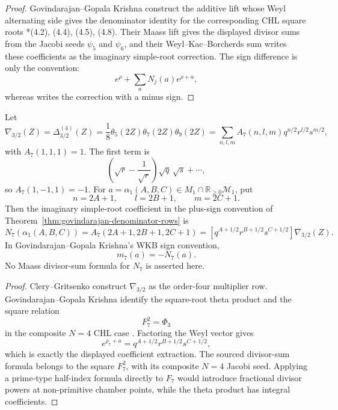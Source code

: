 \documentclass[11pt]{memoir}
\newcommand{\R}{\mathbb{R}} \newcommand{\La}{\Lambda}
\begin{document}
\begin{proof}
Govindarajan--Gopala Krishna construct the additive lift whose Weyl
alternating side gives the denominator identity for the corresponding
CHL square roots \cite{GK09CHL}*{(4.2), (4.4), (4.5), (4.8)}.  Their
Maass lift gives the displayed divisor sums from the Jacobi seeds
$\psi_5$ and $\psi_6$, and their Weyl--Kac--Borcherds sum writes these
coefficients as the imaginary simple-root correction.  The sign
difference is only the convention:
$$
e^\rho+\sum_aN_j(a)e^{\rho+a},
$$
whereas \cite{GK09CHL} writes the correction with a minus sign.
\end{proof}

\begin{lemma}
\label{lem:nabla-three-halves-coefficients}
Let
$$
\nabla_{3/2}(Z)=\Delta^{(4)}_{3/2}(Z)
=\frac18\theta_5(2Z)\theta_7(2Z)\theta_9(2Z)
=\sum_{n,l,m}A_7(n,l,m)q^{n/2}r^{l/2}s^{m/2},
$$
with $A_7(1,1,1)=1$.  The first term is
$$
\left(\sqrt r-\frac1{\sqrt r}\right)\sqrt q\,\sqrt s+\cdots,
$$
so $A_7(1,-1,1)=-1$.  For
$a=\alpha_1(A,B,C)\in M_1\cap\R_{\ge0}\mathcal M_1$, put
$$
n=2A+1,\qquad l=2B+1,\qquad m=2C+1.
$$
Then the imaginary simple-root coefficient in the plus-sign convention
of Theorem~\ref{thm:govindarajan-denominator-rows} is
$$
N_7(\alpha_1(A,B,C))=A_7(2A+1,2B+1,2C+1)
=[q^{A+1/2}r^{B+1/2}s^{C+1/2}]\nabla_{3/2}(Z).
$$
In Govindarajan--Gopala Krishna's WKB sign convention,
$$m_7(a)=-N_7(a).$$
No Maass divisor-sum formula for $N_7$ is asserted here.
\end{lemma}

\begin{proof}
Clery--Gritsenko construct $\nabla_{3/2}$ as the order-four
multiplier row.  Govindarajan--Gopala Krishna identify the square-root
theta product and the square relation
$$
F_7^2=\Phi_3
$$
in the composite $N=4$ CHL case \cite{GK10Composite}.  Factoring the
Weyl vector gives
$$
e^{\rho_7+a}=q^{A+1/2}r^{B+1/2}s^{C+1/2},
$$
which is exactly the displayed coefficient extraction.  The sourced
divisor-sum formula belongs to the square $F_7^2$, with its composite
$N=4$ Jacobi seed.  Applying a prime-type half-index formula directly
to $F_7$ would introduce fractional divisor powers at non-primitive
chamber points, while the theta product has integral coefficients.
\end{proof}
\end{document}

